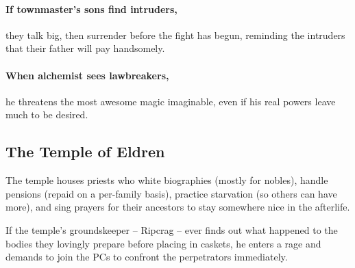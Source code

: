 
\paragraph{If \gls{townmaster}'s sons find intruders,}
they talk big, then surrender before the fight has begun, reminding the intruders that their father will pay handsomely.

\citadelAlchemist

\showStdSpells

\label{citadel_alchemist}

\paragraph{When \gls{alchemist} sees lawbreakers,}
he threatens the most awesome magic imaginable, even if his real powers leave much to be desired.

\townmaster

\subsection{The Temple of Eldren}

The temple houses priests who white biographies (mostly for nobles), handle pensions (repaid on a per-family basis), practice starvation (so others can have more), and sing prayers for their ancestors to stay somewhere nice in the afterlife.

If the temple's groundskeeper -- Ripcrag -- ever finds out what happened to the bodies they lovingly prepare before placing in caskets, he enters a rage and demands to join the PCs to confront the perpetrators immediately.


